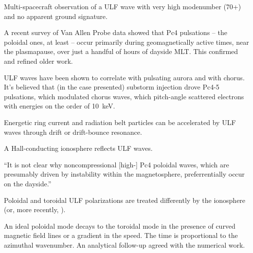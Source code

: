 Multi-spacecraft observation of a ULF wave with very high modenumber (70+) and no apparent ground signature\cite{takahashi_2013}. 

A recent survey of Van Allen Probe data showed that Pc4 pulsations -- the poloidal ones, at least -- occur primarily during geomagnetically active times, near the plasmapause, over just a handful of hours of dayside MLT\cite{dai_2015}. This confirmed and refined older work\cite{engebretson_1987}. 

ULF waves have been shown to correlate with pulsating aurora and with chorus\cite{jaynes_2015}. It's believed that (in the case presented) substorm injection drove Pc4-5 pulsations, which modulated chorus waves, which pitch-angle scattered electrons with energies on the order of \SI{10}{\kilo\eV}. 

Energetic ring current and radiation belt particles can be accelerated by ULF waves through drift or drift-bounce resonance\cite{southwood_1976}. 

A Hall-conducting ionosphere reflects ULF waves\cite{hughes_1974}. 

``It is not clear why noncompressional [high-\azm] Pc4 poloidal waves, which are presumably driven by instability within the magnetosphere, preferrentially occur on the dayside.\cite{dai_2015}''

Poloidal and toroidal ULF polarizations are treated differently by the ionosphere\cite{greifinger_1968} (or, more recently, \cite{fujita_1988}).  



An ideal poloidal mode decays to the toroidal mode in the presence of curved magnetic field lines\cite{radoski_1974} or a gradient in the \Alfven speed\cite{mann_1995}. The time is proportional to the azimuthal wavenumber\cite{mann_1995}. An analytical follow-up agreed with the numerical work\cite{mann_1997}. 


